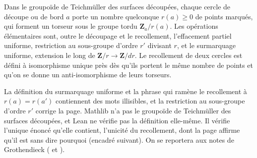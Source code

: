 \begin{encadre}
\begin{definition*}
Dans le groupoïde de Teichmüller des surfaces découpées, chaque cercle de découpe ou de bord $a$ porte un nombre quelconque $r(a) \geq 0$ de points marqués, qui forment un torseur sous le groupe tordu $\mathbf Z_a/r(a)$. Les opérations élémentaires sont, outre le découpage et le recollement, l'effacement partiel uniforme, restriction au sous-groupe d'ordre $r'$ divisant $r$, et le surmarquage uniforme, extension le long de $\mathbf Z/r \to \mathbf Z/dr$. Le recollement de deux cercles est défini à isomorphisme unique près dès qu'ils portent le même nombre de points et qu'on se donne un anti-isomorphisme de leurs torseurs.
\end{definition*}
\end{encadre}
{\small La définition du surmarquage uniforme et la phrase qui ramène le recollement à $r(a) = r(a')$ contiennent des mots illisibles, et la restriction au sous-groupe d'ordre $r'$ corrige la page. Mathlib n'a pas le groupoïde de Teichmüller des surfaces découpées, et Lean ne vérifie pas la définition elle-même. Il vérifie l'unique énoncé qu'elle contient, l'unicité du recollement, dont la page affirme qu'il est  sans dire pourquoi (encadré suivant). On se reportera aux notes de Grothendieck ( et ).\par}

